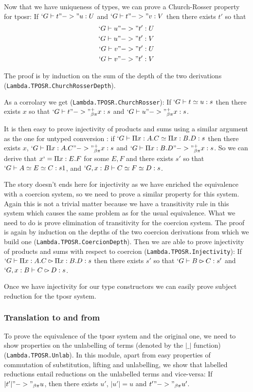 \documentclass[11pt]{article}
\def\TPOSR{{\sc tposr}\xspace}
\def\coqmodule#1{\texttt{#1}}
\begin{document}
Now that we have uniqueness of types, we can prove a Church-Rosser
property for \TPOSR:
If $`G \vdash t "->" u : U$ and $`G \vdash t "->" v : V$ then there exists
$t'$ so that
\begin{eqnarray*}
  `G \vdash u "->" t' : U \\
  `G \vdash u "->" t' : V \\
  `G \vdash v "->" t' : U \\
  `G \vdash v "->" t' : V
\end{eqnarray*}

The proof is by induction on the sum of the depth of the two derivations 
(\coqmodule{Lambda.TPOSR.\-ChurchRosserDepth}).

As a corrolary we get (\coqmodule{Lambda.TPOSR.ChurchRosser}):
If $`G \vdash t \simeq u : s$ then there exists $x$ so that $`G \vdash t
"->"_{\beta\pi}^+ x : s$ and $`G \vdash u "->"_{\beta\pi}^+ x : s$.

It is then easy to prove injectivity of products and sums using a
similar argument as the one for untyped conversion : if $`G \vdash \Pi x :
A. C \simeq \Pi x : B. D : s$ then there exists $x$, $`G \vdash \Pi x : A. C
"->"_{\beta\pi}^+ x : s$ and $`G \vdash \Pi x : B.D "->"_{\beta\pi}^+ x : s$. So we can
derive that $x `= \Pi x : E.F$ for some $E, F$ and there exists $s'$
so that $`G \vdash A \simeq E \simeq C : s1$, and $`G, x : B \vdash C
\simeq F \simeq D : s$.

The story doesn't ends here for injectivity as we have enriched the
equivalence with a coercion system, so we need to prove a similar
property for this system. Again this is not a trivial matter because we
have a transitivity rule in this system which causes the same problem as
for the usual equivalence. What we need to do is prove elimination of
transitivity for the coercion system. The proof is again by induction on
the depths of the two coercion derivations from which we build one 
(\coqmodule{Lambda.TPOSR.CoercionDepth}).
Then we are able to prove injectivity of products and sums with respect
to coercion (\coqmodule{Lambda.TPOSR.Injectivity}):
If $`G \vdash \Pi x : A. C \rightslice \Pi x : B. D : s$ then there exists $s'$
so that $`G \vdash B \rightslice C : s'$ and $`G, x : B \vdash C \rightslice D : s$.

Once we have injectivity for our type constructors we can easily prove
subject reduction for the \TPOSR system.

\subsubsection*{Translation to and from \Russell}
To prove the equivalence of the \TPOSR system and the original one, we
need to show properties on the unlabelling of terms (denoted by the
$|\_|$ function) (\coqmodule{Lambda.TPOSR.Unlab}). In this module, apart from easy
properties of commutation of substitution, lifting and unlabelling,
we show that labelled reductions entail reductions on the unlabelled terms and vice-versa:
If $|t'| "->"_{\beta\pi} u$, then there exists $u'$, $|u'| = u$ and $t'
"->"_{\beta\pi} u'$. 
\end{document}
